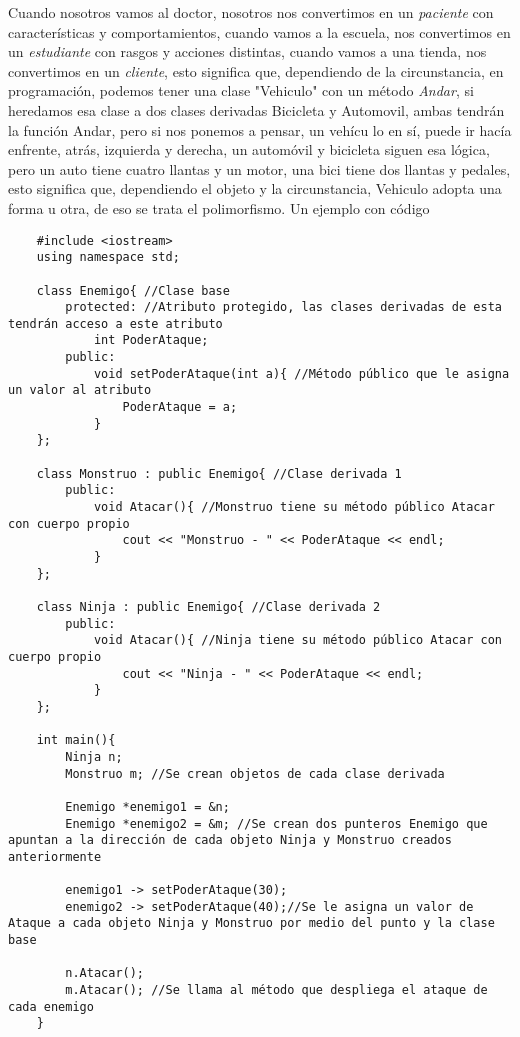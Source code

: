Cuando nosotros vamos al doctor, nosotros nos convertimos en un \textit{paciente} con características y comportamientos, cuando vamos a la escuela, nos convertimos en un \textit{estudiante} con rasgos y acciones distintas, cuando vamos a una tienda, nos convertimos en un \textit{cliente}, esto significa que, dependiendo de la circunstancia, en programación, podemos tener una clase "Vehiculo" con un método \textit{Andar}, si heredamos esa clase a dos clases derivadas Bicicleta y Automovil, ambas tendrán la función Andar, pero si nos ponemos a pensar, un vehícu  lo en sí, puede ir hacía enfrente, atrás, izquierda y derecha, un automóvil y bicicleta siguen esa lógica, pero un auto tiene cuatro llantas y un motor, una bici tiene dos llantas y pedales, esto significa que, dependiendo el objeto y la circunstancia, Vehiculo adopta una forma u otra, de eso se trata el polimorfismo. Un ejemplo con código
\begin{lstlisting}
    #include <iostream>
    using namespace std;
    
    class Enemigo{ //Clase base
        protected: //Atributo protegido, las clases derivadas de esta tendrán acceso a este atributo
            int PoderAtaque;
        public:
            void setPoderAtaque(int a){ //Método público que le asigna un valor al atributo
                PoderAtaque = a;
            }
    };
    
    class Monstruo : public Enemigo{ //Clase derivada 1
        public:
            void Atacar(){ //Monstruo tiene su método público Atacar con cuerpo propio
                cout << "Monstruo - " << PoderAtaque << endl;
            }
    };
    
    class Ninja : public Enemigo{ //Clase derivada 2
        public:
            void Atacar(){ //Ninja tiene su método público Atacar con cuerpo propio
                cout << "Ninja - " << PoderAtaque << endl;
            }
    };
    
    int main(){
        Ninja n;
        Monstruo m; //Se crean objetos de cada clase derivada
        
        Enemigo *enemigo1 = &n;
        Enemigo *enemigo2 = &m; //Se crean dos punteros Enemigo que apuntan a la dirección de cada objeto Ninja y Monstruo creados anteriormente
        
        enemigo1 -> setPoderAtaque(30);
        enemigo2 -> setPoderAtaque(40);//Se le asigna un valor de Ataque a cada objeto Ninja y Monstruo por medio del punto y la clase base
        
        n.Atacar();
        m.Atacar(); //Se llama al método que despliega el ataque de cada enemigo
    }
\end{lstlisting}

